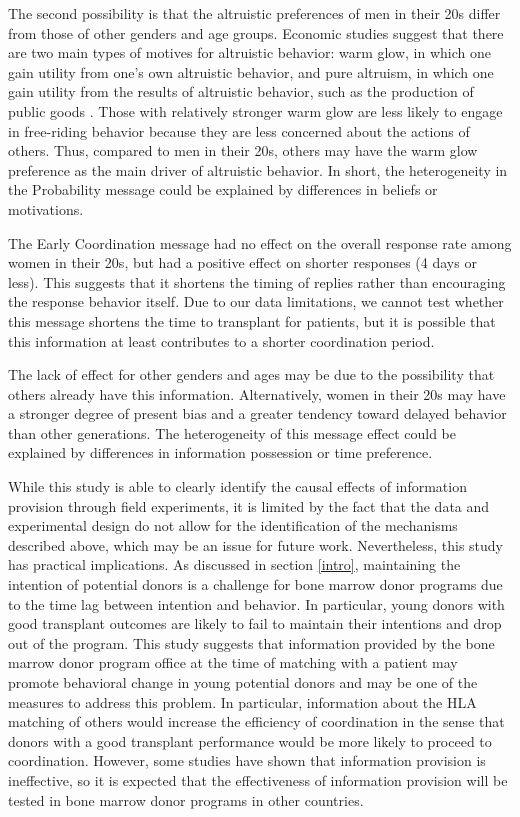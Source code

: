 \documentclass[
]{article}
\begin{document}
The second possibility is that the altruistic preferences of men in their 20s differ from those of other genders and age groups. Economic studies suggest that there are two main types of motives for altruistic behavior: warm glow, in which one gain utility from one's own altruistic behavior, and pure altruism, in which one gain utility from the results of altruistic behavior, such as the production of public goods \citep{Andreoni1990}. Those with relatively stronger warm glow are less likely to engage in free-riding behavior because they are less concerned about the actions of others. Thus, compared to men in their 20s, others may have the warm glow preference as the main driver of altruistic behavior. In short, the heterogeneity in the Probability message could be explained by differences in beliefs or motivations.

The Early Coordination message had no effect on the overall response rate among women in their 20s, but had a positive effect on shorter responses (4 days or less). This suggests that it shortens the timing of replies rather than encouraging the response behavior itself. Due to our data limitations, we cannot test whether this message shortens the time to transplant for patients, but it is possible that this information at least contributes to a shorter coordination period.

The lack of effect for other genders and ages may be due to the possibility that others already have this information. Alternatively, women in their 20s may have a stronger degree of present bias and a greater tendency toward delayed behavior than other generations. The heterogeneity of this message effect could be explained by differences in information possession or time preference.

While this study is able to clearly identify the causal effects of information provision through field experiments, it is limited by the fact that the data and experimental design do not allow for the identification of the mechanisms described above, which may be an issue for future work. Nevertheless, this study has practical implications. As discussed in section \ref{intro}, maintaining the intention of potential donors is a challenge for bone marrow donor programs due to the time lag between intention and behavior. In particular, young donors with good transplant outcomes are likely to fail to maintain their intentions and drop out of the program. This study suggests that information provided by the bone marrow donor program office at the time of matching with a patient may promote behavioral change in young potential donors and may be one of the measures to address this problem. In particular, information about the HLA matching of others would increase the efficiency of coordination in the sense that donors with a good transplant performance would be more likely to proceed to coordination. However, some studies \citep[e.g.][]{Switzer2018} have shown that information provision is ineffective, so it is expected that the effectiveness of information provision will be tested in bone marrow donor programs in other countries.
\end{document}
